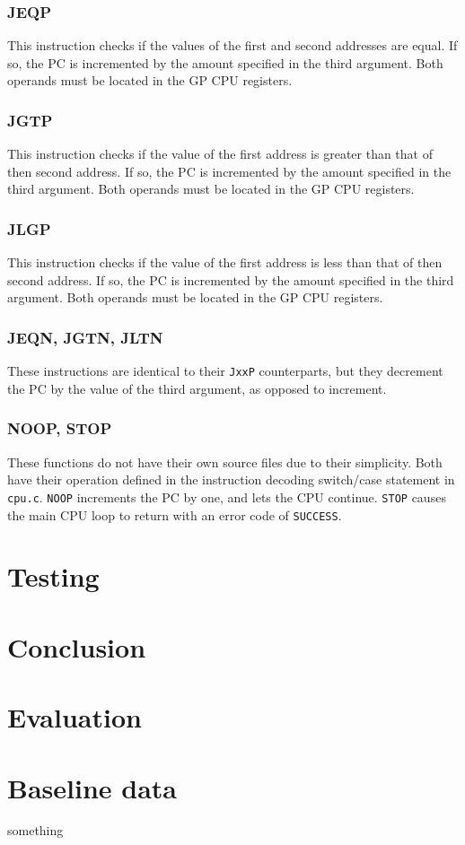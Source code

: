 \documentclass[a4paper,11pt]{article}
\begin{document}
        \subsubsection{JEQP}
            This instruction checks if the values of the first and second addresses are equal. If so, the PC is incremented by the amount specified in the third argument. Both operands must be located in the GP CPU registers.
            
        \subsubsection{JGTP}
            This instruction checks if the value of the first address is greater than that of then second address. If so, the PC is incremented by the amount specified in the third argument. Both operands must be located in the GP CPU registers.
            
        \subsubsection{JLGP}
            This instruction checks if the value of the first address is less than that of then second address. If so, the PC is incremented by the amount specified in the third argument. Both operands must be located in the GP CPU registers.
            
        \subsubsection{JEQN, JGTN, JLTN}
            These instructions are identical to their \lstinline{JxxP} counterparts, but they decrement the PC by the value of the third argument, as opposed to increment.
            
        \subsubsection{NOOP, STOP}
            These functions do not have their own source files due to their simplicity. Both have their operation defined in the instruction decoding switch/case statement in \lstinline{cpu.c}. \lstinline{NOOP} increments the PC by one, and lets the CPU continue. \lstinline{STOP} causes the main CPU loop to return with an error code of \lstinline{SUCCESS}.
    
\section{Testing}

\section{Conclusion}
\section{Evaluation}

\begin{appendices}
    \label{appendix}
    \section{Baseline data}
    \label{dat:baseline}
        something
\end{appendices}



\end{document}
